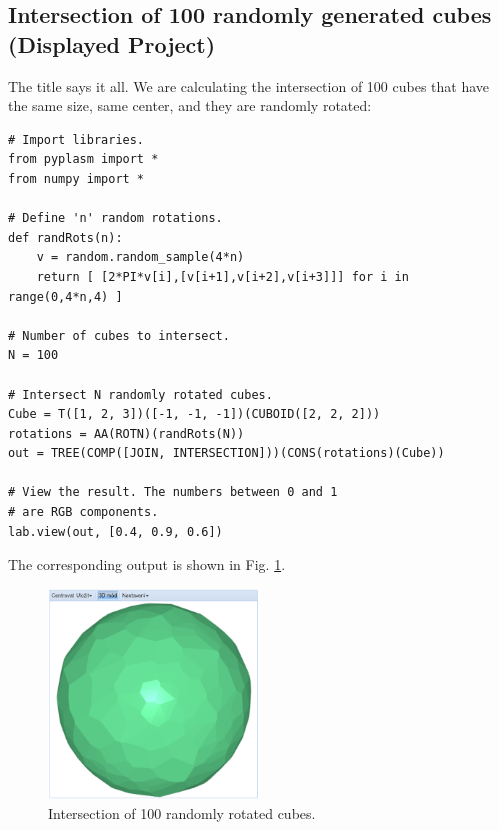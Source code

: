 \documentclass[article,A4,12pt]{llncs}
\begin{document}
\subsection{Intersection of 100 randomly generated cubes (Displayed Project)}

The title says it all. We are calculating the intersection of 
100 cubes that have the same size, same center, and they are 
randomly rotated:
{\small
\begin{verbatim}
# Import libraries.
from pyplasm import *
from numpy import *

# Define 'n' random rotations.
def randRots(n):
    v = random.random_sample(4*n)
    return [ [2*PI*v[i],[v[i+1],v[i+2],v[i+3]]] for i in range(0,4*n,4) ]

# Number of cubes to intersect.
N = 100
  
# Intersect N randomly rotated cubes.
Cube = T([1, 2, 3])([-1, -1, -1])(CUBOID([2, 2, 2]))
rotations = AA(ROTN)(randRots(N))
out = TREE(COMP([JOIN, INTERSECTION]))(CONS(rotations)(Cube))

# View the result. The numbers between 0 and 1 
# are RGB components.
lab.view(out, [0.4, 0.9, 0.6])
\end{verbatim}
}
\noindent
The corresponding output is shown in Fig. \ref{fig:random_cubes}.

\begin{figure}[!ht]
\begin{center}
\includegraphics[width=0.5\textwidth]{img/random_cubes.png}
\end{center}
\vspace{-2mm}
\caption{Intersection of 100 randomly rotated cubes.}
\label{fig:random_cubes}
\end{figure}
\noindent
\end{document}
